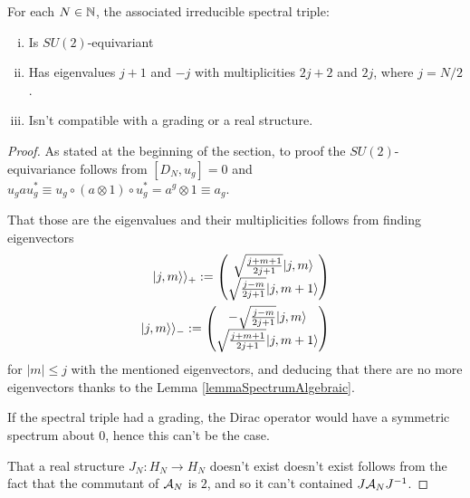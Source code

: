 \begin{proposition}\label{propIrredSpectralTriple}
For each $N \in \mathbb{N}$, the associated irreducible spectral triple:
    \begin{enumerate}[(i)]
        
    \item Is $SU(2)$-equivariant
    
    \item Has eigenvalues $j+1$ and $-j$ with multiplicities $2j+2$ and $2j$, where $j = N/2$.
        
    \item Isn't compatible with a grading or a real structure.
    \end{enumerate}
\end{proposition}

\begin{proof}
As stated at the beginning of the section, to proof the $SU(2)$-equivariance follows from $[D_N, u_g] = 0$ and $u_g  a  u_g^* \equiv u_g \circ (a \otimes 1) \circ u_g^* = a^g \otimes 1 \equiv a_g$.

That those are the eigenvalues and their multiplicities follows from finding eigenvectors 
\begin{align}\label{irreducibleDiracFuzzySpinorBasis}
    |j, m \rangle\rangle_+ := 
    \begin{pmatrix} 
    \sqrt{\frac{j+m+1}{2j+1}} |j, m\rangle \\ 
    \sqrt{\frac{j-m}{2j+1}} |j, m+1 \rangle
    \end{pmatrix} \\
    |j, m\rangle\rangle_- := 
    \begin{pmatrix} 
    -\sqrt{\frac{j-m}{2j+1}} |j, m\rangle \\ 
    \sqrt{\frac{j+m+1}{2j+1}} |j, m+1 \rangle
    \end{pmatrix}
\end{align}
for $|m| \leq j$ with the mentioned eigenvectors, and deducing that there are no more eigenvectors thanks to the Lemma \ref{lemmaSpectrumAlgebraic}.

If the spectral triple had a grading, the Dirac operator would have a symmetric spectrum about $0$, hence this can't be the case.

That a real structure $J_N: H_N \to H_N$ doesn't exist doesn't exist follows from the fact that the commutant of $\mathcal A_N$ is $2$, and so it can't contained $J \mathcal A_N J^{-1}$.

\end{proof}


